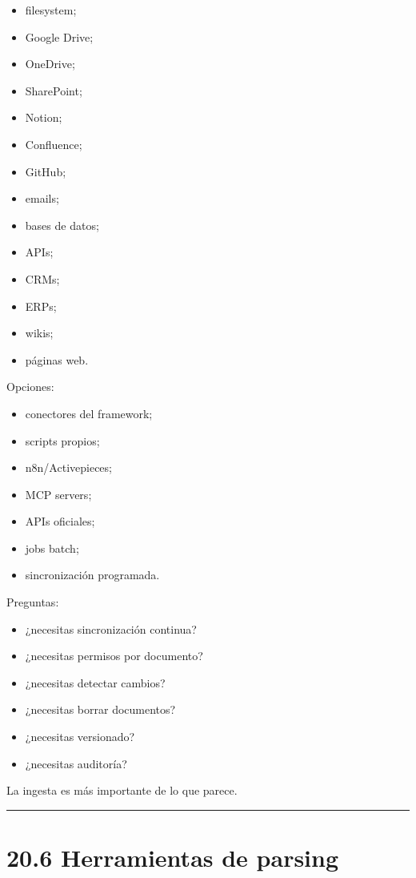 \begin{itemize}
\tightlist
\item
  filesystem;
\item
  Google Drive;
\item
  OneDrive;
\item
  SharePoint;
\item
  Notion;
\item
  Confluence;
\item
  GitHub;
\item
  emails;
\item
  bases de datos;
\item
  APIs;
\item
  CRMs;
\item
  ERPs;
\item
  wikis;
\item
  páginas web.
\end{itemize}

Opciones:

\begin{itemize}
\tightlist
\item
  conectores del framework;
\item
  scripts propios;
\item
  n8n/Activepieces;
\item
  MCP servers;
\item
  APIs oficiales;
\item
  jobs batch;
\item
  sincronización programada.
\end{itemize}

Preguntas:

\begin{itemize}
\tightlist
\item
  ¿necesitas sincronización continua?
\item
  ¿necesitas permisos por documento?
\item
  ¿necesitas detectar cambios?
\item
  ¿necesitas borrar documentos?
\item
  ¿necesitas versionado?
\item
  ¿necesitas auditoría?
\end{itemize}

La ingesta es más importante de lo que parece.

\begin{center}\rule{0.5\linewidth}{0.5pt}\end{center}

\section{20.6 Herramientas de parsing}\label{herramientas-de-parsing}

